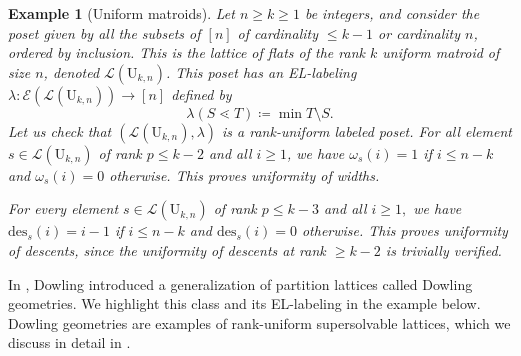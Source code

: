 \documentclass[11pt,a4paper]{amsart}
\theoremstyle{results}
\theoremstyle{definitions}
\newtheorem{example}[thm]{Example}
\renewcommand{\L}{\mathcal{L}}
\newcommand{\des}{\mathrm{des}}
\newcommand{\Edge}{\mathcal{E}}
\renewcommand{\L}{\mathcal{L}}
\begin{document}
\begin{example}[Uniform matroids]\label{ex:uniform-matroid}
Let $n \geqslant k \geqslant 1$ be integers, and consider the poset given by all the subsets of $[n]$ of cardinality $\leqslant k-1$ or cardinality $n$, ordered by inclusion. This is the lattice of flats of the rank $k$ uniform matroid of size $n$, denoted $\L(\mathrm{U}_{k,n})$. This poset has an EL-labeling $\lambda: \Edge(\L(\mathrm{U}_{k,n})) \rightarrow [n]$ defined by 
$$ \lambda(S \lessdot T ) \coloneqq \min T\setminus S.$$ Let us check that $(\L(\mathrm{U}_{k,n}), \lambda)$ is a rank-uniform labeled poset. For all element $s \in \L(\mathrm{U}_{k,n})$ of rank $p \leqslant k-2$ and all $i\geqslant 1$, we have $\omega_{s}(i) = 1$ if $i \leqslant n-k$ and $\omega_s(i) = 0$ otherwise. This proves uniformity of widths.

For every element $s \in \L(\mathrm{U}_{k,n})$ of rank $p \leqslant k-3$ and all $i\geqslant 1,$ we have $\des_{s}(i) = i-1$ if $i \leqslant n-k$ and $\des_s(i) = 0$ otherwise. This proves uniformity of descents, since the uniformity of descents at rank $\geqslant k-2$ is trivially verified. 
\end{example}

In \cite{dowling1973class, dowling1973q}, Dowling introduced a generalization of partition lattices called Dowling geometries. We highlight this class and its EL-labeling in the example below. Dowling geometries are examples of rank-uniform supersolvable lattices, which we discuss in detail in .
\end{document}
